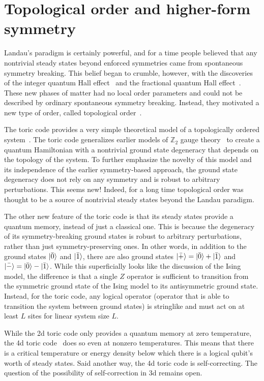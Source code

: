 \section{Topological order and higher-form symmetry}

Landau's paradigm is certainly powerful, and for a time people believed that any nontrivial steady states beyond enforced symmetries came from spontaneous symmetry breaking. This belief began to crumble, however, with the discoveries of the integer quantum Hall effect~\cite{Klitzing1980Quantized} and the fractional quantum Hall effect~\cite{Tsui1982Extreme}.  These new phases of matter had no local order parameters and could not be described by ordinary spontaneous symmetry breaking. Instead, they motivated a new type of order, called topological order~\cite{Wen1990Topological}.

The toric code provides a very simple theoretical model of a topologically ordered system~\cite{Kitaev2003Fault}. The toric code generalizes earlier models of $\mathbb{Z}_2$ gauge theory~\cite{Wegner1971Duality} to create a quantum Hamiltonian with a nontrivial ground state degeneracy that depends on the topology of the system. To further emphasize the novelty of this model and its independence of the earlier symmetry-based approach, the ground state degeneracy does not rely on any symmetry and is robust to arbitrary perturbations. This seems new! Indeed, for a long time topological order was thought to be a source of nontrivial steady states beyond the Landau paradigm.

The other new feature of the toric code is that its steady states provide a quantum memory, instead of just a classical one. This is because the degeneracy of its symmetry-breaking ground states is robust to arbitrary perturbations, rather than just symmetry-preserving ones. In other words, in addition to the ground states $\ket{\bar{0}}$ and $\ket{\bar{1}}$, there are also ground states $\ket{\bar{+}} = \ket{\bar{0}} + \ket{\bar{1}}$ and $\ket{\bar{-}} = \ket{\bar{0}} - \ket{\bar{1}}$. While this superficially looks like the discussion of the Ising model, the difference is that a single $Z$ operator is sufficient to transition from the symmetric ground state of the Ising model to its antisymmetric ground state. Instead, for the toric code, any logical operator (operator that is able to transition the system between ground states) is stringlike and must act on at least $L$ sites for linear system size $L$.

While the 2d toric code only provides a quantum memory at zero temperature, the 4d toric code~\cite{Dennis2002Topological} does so even at nonzero temperatures. This means that there is a critical temperature or energy density below which there is a logical qubit's worth of steady states. Said another way, the 4d toric code is self-correcting. The question of the possibility of self-correction in 3d remains open.

